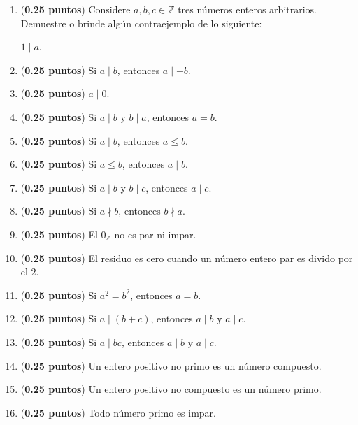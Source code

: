 \documentclass[fontsize=12pt]{scrartcl}
\begin{document}
	\begin{enumerate}
		\item ({\bf 0.25 puntos}) 		
		Considere $a, b, c \in \mathbb{Z}$ tres n\'umeros enteros arbitrarios.
		Demuestre o brinde alg\'un contraejemplo de lo siguiente:
		
		$1 \mid a$.
		
		\item ({\bf 0.25 puntos})
		Si $a \mid b$, entonces $a \mid -b$.
		
		\item ({\bf 0.25 puntos})
		$a \mid 0$.
		
		\item ({\bf 0.25 puntos})
		Si $a \mid b$ y $b \mid a$, entonces $a = b$.
		
		\item ({\bf 0.25 puntos})
		Si $a \mid b$, entonces $a \leq b$.
		
		\item ({\bf 0.25 puntos})
		Si $a \leq b$, entonces $a\mid b$.
		
		\item ({\bf 0.25 puntos})
		Si $a \mid b$ y $b \mid c$, entonces $a \mid c$.
		
		\item ({\bf 0.25 puntos})
		Si $a \nmid b$, entonces $b \nmid a$.
		
		\item ({\bf 0.25 puntos})
		El $0_{\mathbb{Z}}$ no es par ni impar.
		
		\item ({\bf 0.25 puntos})
		El residuo es cero cuando un n\'umero entero par es divido por el $2$.
		
		\item ({\bf 0.25 puntos})
		Si $a^{2} = b^{2}$, entonces $a = b$.
		
		\item ({\bf 0.25 puntos})
		Si $a \mid (b + c)$, entonces $a \mid b$ y $a \mid c$.
		
		\item ({\bf 0.25 puntos})
		Si $a \mid bc$, entonces $a \mid b$ y $a \mid c$.
		
		\item ({\bf 0.25 puntos})
		Un entero positivo no primo es un n\'umero compuesto.
		
		\item ({\bf 0.25 puntos})
		Un entero positivo no compuesto es un n\'umero primo.
		
		\item ({\bf 0.25 puntos})
		Todo n\'umero primo es impar.
		

\end{enumerate}
\end{document}
